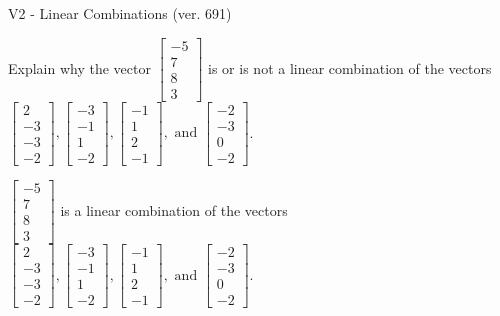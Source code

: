 \begin{exercise}
  \begin{exerciseTitle}V2 - Linear Combinations (ver. 691)\end{exerciseTitle}
  \begin{exerciseStatement}
    Explain why the vector \(\left[\begin{array}{c}
-5 \\
7 \\
8 \\
3
\end{array}\right]\)  is or is not a linear 
	combination of the vectors \(\left[\begin{array}{c}
2 \\
-3 \\
-3 \\
-2
\end{array}\right] , \left[\begin{array}{c}
-3 \\
-1 \\
1 \\
-2
\end{array}\right] , \left[\begin{array}{c}
-1 \\
1 \\
2 \\
-1
\end{array}\right] , \text{ and } \left[\begin{array}{c}
-2 \\
-3 \\
0 \\
-2
\end{array}\right]\).
	


  \end{exerciseStatement}
  \begin{exerciseAnswer}
   \(\left[\begin{array}{c}
-5 \\
7 \\
8 \\
3
\end{array}\right]\) 
  	 is  
	a linear combination of the vectors \(\left[\begin{array}{c}
2 \\
-3 \\
-3 \\
-2
\end{array}\right] , \left[\begin{array}{c}
-3 \\
-1 \\
1 \\
-2
\end{array}\right] , \left[\begin{array}{c}
-1 \\
1 \\
2 \\
-1
\end{array}\right] , \text{ and } \left[\begin{array}{c}
-2 \\
-3 \\
0 \\
-2
\end{array}\right]\).


\end{exerciseAnswer}
\end{exercise}
